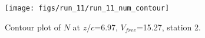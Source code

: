\begin{figure}[H]
\centering
\texttt{[image: figs/run\_11/run\_11\_num\_contour]}
\caption{Contour plot of $N$ at $z/c$=6.97, $V_{free}$=15.27, station 2.}
\label{fig:run_11_num_contour}
\end{figure}


